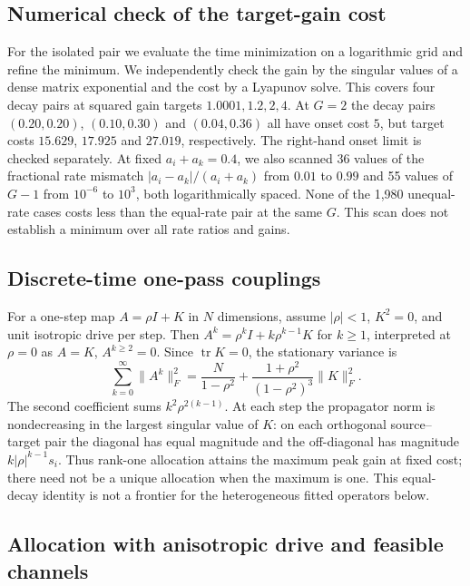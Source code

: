 \documentclass[aps,10pt,onecolumn,superscriptaddress,nofootinbib,
  longbibliography,amsmath,amssymb,floatfix]{revtex4-2}
\newcommand{\Tr}{\operatorname{tr}}
\begin{document}
\subsection{Numerical check of the target-gain cost}
For the isolated pair we evaluate the time minimization on a
logarithmic grid and refine the minimum. We independently check the
gain by the singular values of a dense matrix exponential and the
cost by a Lyapunov solve. This covers four decay pairs at squared
gain targets \(1.0001,1.2,2,4\). At \(G=2\) the decay pairs
\((0.20,0.20)\), \((0.10,0.30)\) and \((0.04,0.36)\) all have onset
cost \(5\), but target costs \(15.629\), \(17.925\) and \(27.019\),
respectively. The right-hand onset limit is checked separately.
At fixed \(a_i+a_k=0.4\), we also scanned 36 values of the fractional
rate mismatch \(|a_i-a_k|/(a_i+a_k)\) from \(0.01\) to \(0.99\) and 55
values of \(G-1\) from \(10^{-6}\) to \(10^3\), both logarithmically
spaced. None of the 1,980 unequal-rate cases costs less than the
equal-rate pair at the same \(G\). This scan does not establish a
minimum over all rate ratios and gains.

\subsection{Discrete-time one-pass couplings}
For a one-step map \(A=\rho I+K\) in \(N\) dimensions, assume
\(|\rho|<1\), \(K^2=0\), and unit isotropic drive per step. Then
\(A^k=\rho^k I+k\rho^{k-1}K\) for \(k\ge1\), interpreted at
\(\rho=0\) as \(A=K\), \(A^{k\ge2}=0\). Since \(\Tr K=0\), the
stationary variance is
\begin{equation}
 \sum_{k=0}^{\infty}\|A^k\|_F^2
 =\frac{N}{1-\rho^2}+
   \frac{1+\rho^2}{(1-\rho^2)^3}\|K\|_F^2.
\end{equation}
The second coefficient sums \(k^2\rho^{2(k-1)}\). At each step the
propagator norm is nondecreasing in the largest singular value of
\(K\): on each orthogonal source--target pair the diagonal has equal
magnitude and the off-diagonal has magnitude \(k|\rho|^{k-1}s_i\).
Thus rank-one allocation attains the maximum peak gain at fixed cost;
there need not be a unique allocation when the maximum is one.
This equal-decay identity is not a frontier for the heterogeneous
fitted operators below.

\subsection{Allocation with anisotropic drive and feasible channels}
\end{document}
